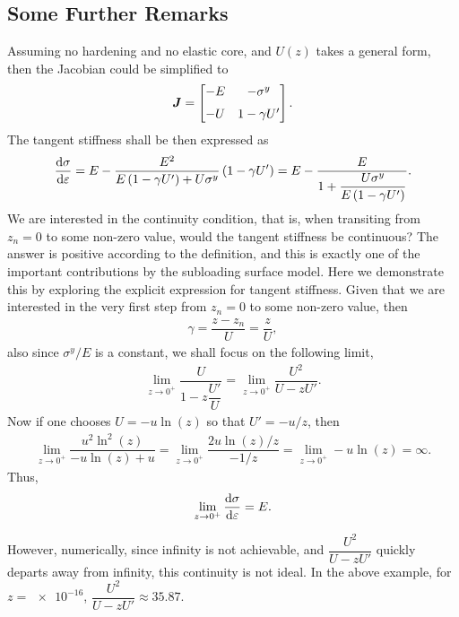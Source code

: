 \subsection{Some Further Remarks}
Assuming no hardening and no elastic core, and $U\left(z\right)$ takes a general form, then the Jacobian could be simplified to
\begin{gather}
\bm{J}=\begin{bmatrix}
-E&-\sigma^y\\[2mm]
-U&1-\gamma{}U'
\end{bmatrix}.
\end{gather}
The tangent stiffness shall be then expressed as
\begin{gather}
\dfrac{\mathrm{d}\sigma}{\mathrm{d}\varepsilon}=E-\dfrac{E^2}{E\left(1-\gamma{}U'\right)+U\sigma^y}\left(1-\gamma{}U'\right)=E-\dfrac{E}{1+\dfrac{U\sigma^y}{E\left(1-\gamma{}U'\right)}}.
\end{gather}
We are interested in the continuity condition, that is, when transiting from $z_n=0$ to some non-zero value, would the tangent stiffness be continuous?
The answer is positive according to the definition, and this is exactly one of the important contributions by the subloading surface model.
Here we demonstrate this by exploring the explicit expression for tangent stiffness.
Given that we are interested in the very first step from $z_n=0$ to some non-zero value, then
\begin{gather}
\gamma=\dfrac{z-z_n}{U}=\dfrac{z}{U},
\end{gather}
also since $\sigma^y/E$ is a constant, we shall focus on the following limit,
\begin{gather}
\lim\limits_{z\rightarrow0^+}\dfrac{U}{1-z\dfrac{U'}{U}}=\lim\limits_{z\rightarrow0^+}\dfrac{U^2}{U-zU'}.
\end{gather}
Now if one chooses $U=-u\ln\left(z\right)$ so that $U'=-u/z$, then
\begin{gather}
\lim\limits_{z\rightarrow0^+}\dfrac{u^2\ln^2\left(z\right)}{-u\ln\left(z\right)+u}=\lim\limits_{z\rightarrow0^+}\dfrac{2u\ln\left(z\right)/z}{-1/z}=\lim\limits_{z\rightarrow0^+}-u\ln\left(z\right)=\infty.
\end{gather}
Thus,
\begin{gather}
\lim\limits_{z\rightarrow0^+}\dfrac{\mathrm{d}\sigma}{\mathrm{d}\varepsilon}=E.
\end{gather}

However, numerically, since infinity is not achievable, and $\dfrac{U^2}{U-zU'}$ quickly departs away from infinity, this continuity is not ideal.
In the above example, for $z=\num{e-16}$, $\dfrac{U^2}{U-zU'}\approx35.87$.

